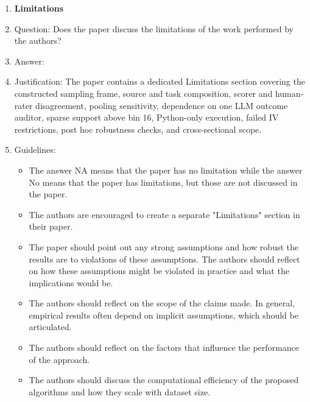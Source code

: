 \begin{enumerate}
\item {\bf Limitations}
    \item[] Question: Does the paper discuss the limitations of the work performed by the authors?
    \item[] Answer: \answerYes{}
    \item[] Justification: The paper contains a dedicated Limitations section covering the constructed sampling frame, source and task composition, scorer and human-rater disagreement, pooling sensitivity, dependence on one LLM outcome auditor, sparse support above bin 16, Python-only execution, failed IV restrictions, post hoc robustness checks, and cross-sectional scope.
    \item[] Guidelines:
    \begin{itemize}
        \item The answer NA means that the paper has no limitation while the answer No means that the paper has limitations, but those are not discussed in the paper.
        \item The authors are encouraged to create a separate "Limitations" section in their paper.
        \item The paper should point out any strong assumptions and how robust the results are to violations of these assumptions. The authors should reflect on how these assumptions might be violated in practice and what the implications would be.
        \item The authors should reflect on the scope of the claims made. In general, empirical results often depend on implicit assumptions, which should be articulated.
        \item The authors should reflect on the factors that influence the performance of the approach.
        \item The authors should discuss the computational efficiency of the proposed algorithms and how they scale with dataset size.
    \end{itemize}


\end{enumerate}
